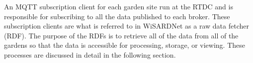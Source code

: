 An MQTT subscription client for each garden site run at the RTDC and is responsible for subscribing to all the data published to each broker. These subscription clients are what is referred to in WiSARDNet as a raw data fetcher (RDF).  The purpose of the RDFs is to retrieve all of the data from all of the gardens so that the data is accessible for processing, storage, or viewing. These processes are discussed in detail in the following section.\\


